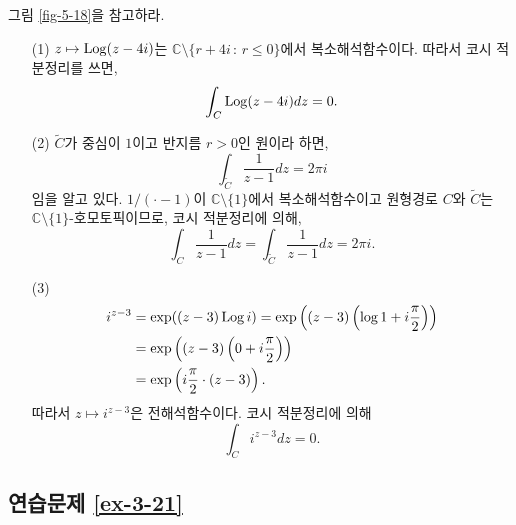 그림 \ref{fig-5-18}을 참고하라.

\begin{itemize}
\item[(1)]  $z\mapsto \mathop{\mathrm{Log}}(z-4i)$는 $\mathbb C \setminus \{r+4i \,:\, r\le0\}$에서
복소해석함수이다. 따라서 코시 적분정리를 쓰면,
\[
\int_C \mathop{\mathrm{Log}} (z-4i)dz = 0.
\]
\item[(2)] $\tilde C$가 중심이 $1$이고 반지름 $r>0$인 원이라 하면,
\[
\int_{\tilde C} \dfrac1{z-1} dz = 2\pi i
\]
임을 알고 있다.
$1/(\cdot -1)$이 $\mathbb C\setminus\{1\}$에서 복소해석함수이고
원형경로 $C$와 $\tilde C$는 $\mathbb C\setminus\{1\}$-호모토픽이므로,
코시 적분정리에 의해,
\[
\int_C \dfrac1{z-1} dz = \int_{\tilde C} \dfrac1{z-1}dz = 2\pi i.
\]
\item[(3)] 
\begin{align*}
i^{z-3} &= \exp((z-3)\mathop{\mathrm{Log}} i) = \exp\left( (z-3)\left( \log 1 + i\displaystyle\frac\pi2\right)\right) \\
&= \exp\left( (z-3)\left(0+i\displaystyle\frac\pi2\right)\right) \\
&= \exp\left( i\displaystyle\frac\pi2 \cdot(z-3)\right).
\end{align*}
따라서 $z\mapsto i^{z-3}$은 전해석함수이다.
코시 적분정리에 의해
\[
\int_C i^{z-3}dz = 0.
\]
\end{itemize}

\subsection*{연습문제 \ref{ex-3-21}}

